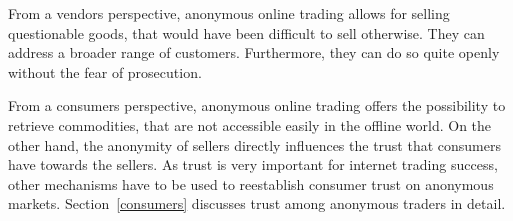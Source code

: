 From a vendors perspective, anonymous online trading allows for selling questionable goods, that would have been difficult to sell otherwise. They can address a broader range of customers. Furthermore, they can do so quite openly without the fear of prosecution.

From a consumers perspective, anonymous online trading offers the possibility to retrieve commodities, that are not accessible easily in the offline world. On the other hand, the anonymity of sellers directly influences the trust that consumers have towards the sellers. As trust is very important for internet trading success\cite{internetTrust2004}, other mechanisms  have to be used to reestablish consumer trust on anonymous markets. Section~\ref{consumers} discusses trust among anonymous traders in detail.